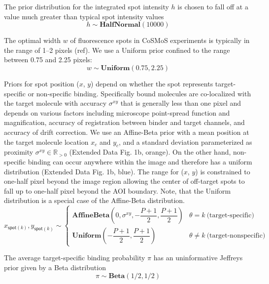 The prior distribution for the integrated spot intensity $h$ is chosen to fall off at a value much greater than typical spot intensity values 
%
\begin{equation}
    h \sim \mathbf{HalfNormal}(10000)
\end{equation}

The optimal width $w$ of fluorescence spots in CoSMoS experiments is typically in the range of 1--2 pixels (ref). We use a Uniform prior confined to the range between 0.75 and 2.25 pixels:
%
\begin{equation}
    w \sim \mathbf{Uniform}(0.75, 2.25)
\end{equation}

Priors for spot position ($x$, $y$) depend on whether the spot represents target-specific or non-specific binding. Specifically bound molecules are co-localized with the target molecule with accuracy $\sigma^{xy}$ that is generally less than one pixel and depends on various factors including microscope point-spread function and magnification, accuracy of registration between binder and target channels, and accuracy of drift correction. We use an Affine-Beta prior with a mean position at the target molecule location $x_c$ and $y_c$, and a standard deviation parameterized as proximity $\sigma^{xy} \in \mathbb{R}_{>0} $ (Extended Data Fig. 1b, orange). On the other hand, non-specific binding can occur anywhere within the image and therefore has a uniform distribution (Extended Data Fig. 1b, blue).  The range for ($x$, $y$) is constrained to one-half pixel beyond the image region allowing the center of off-target spots to fall up to one-half pixel beyond the AOI boundary. Note, that the Uniform distribution is a special case of the Affine-Beta distribution.
%
\begin{equation}
    x_{\mathsf{spot}(k)}, y_{\mathsf{spot}(k)} \sim
    \begin{cases}
        \mathbf{AffineBeta}\left( 0, \sigma^{xy}, -\dfrac{P+1}{2}, \dfrac{P+1}{2} \right) & \theta = k ~\textrm{(target-specific)} \\
        \mathbf{Uniform}\left(-\dfrac{P+1}{2}, \dfrac{P+1}{2} \right) & \theta \neq k ~\text{(target-nonspecific)}
    \end{cases}
\end{equation}

The average target-specific binding probability $\pi$ has an uninformative Jeffreys prior given by a Beta distribution
%
\begin{equation}
    \pi \sim \mathbf{Beta}(1/2, 1/2)
\end{equation}

